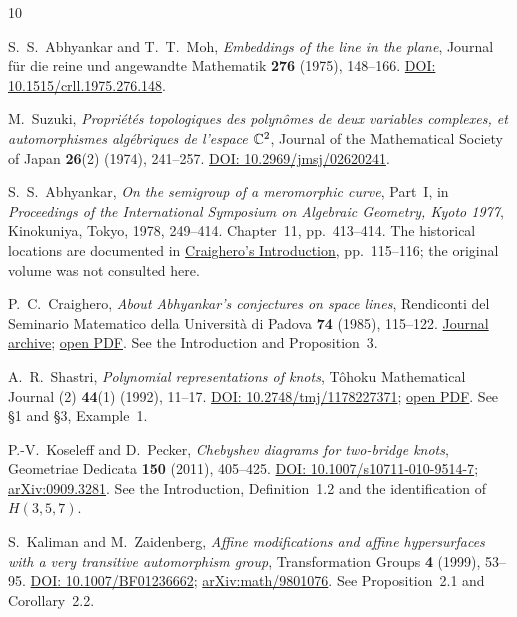 \begin{thebibliography}{10}
\small
\setlength{\itemsep}{7pt}

S.~S.~Abhyankar and T.~T.~Moh,
\emph{Embeddings of the line in the plane},
Journal f\"ur die reine und angewandte Mathematik \textbf{276}
(1975), 148--166.
\href{https://doi.org/10.1515/crll.1975.276.148}{DOI: 10.1515/crll.1975.276.148}.

M.~Suzuki,
\emph{Propri\'et\'es topologiques des polyn\^omes de deux variables
complexes, et automorphismes alg\'ebriques de l'espace $\mathbb C^2$},
Journal of the Mathematical Society of Japan \textbf{26}(2)
(1974), 241--257.
\href{https://doi.org/10.2969/jmsj/02620241}{DOI: 10.2969/jmsj/02620241}.

S.~S.~Abhyankar,
\emph{On the semigroup of a meromorphic curve}, Part~I,
in \emph{Proceedings of the International Symposium on Algebraic
Geometry, Kyoto 1977}, Kinokuniya, Tokyo, 1978, 249--414.
Chapter~11, pp.~413--414.
The historical locations are documented in
\href{https://www.numdam.org/item/RSMUP_1985__74__115_0.pdf}{Craighero's
Introduction}, pp.~115--116; the original volume was not consulted here.

P.~C.~Craighero,
\emph{About Abhyankar's conjectures on space lines},
Rendiconti del Seminario Matematico della Universit\`a di Padova
\textbf{74} (1985), 115--122.
\href{https://www.numdam.org/item/RSMUP_1985__74__115_0/}{Journal archive};
\href{https://www.numdam.org/item/RSMUP_1985__74__115_0.pdf}{open PDF}.
See the Introduction and Proposition~3.

A.~R.~Shastri,
\emph{Polynomial representations of knots},
T\^ohoku Mathematical Journal (2) \textbf{44}(1) (1992), 11--17.
\href{https://doi.org/10.2748/tmj/1178227371}{DOI: 10.2748/tmj/1178227371};
\href{https://www.jstage.jst.go.jp/article/tmj1949/44/1/44_1_11/_pdf}{open PDF}.
See \S1 and \S3, Example~1.

P.-V.~Koseleff and D.~Pecker,
\emph{Chebyshev diagrams for two-bridge knots},
Geometriae Dedicata \textbf{150} (2011), 405--425.
\href{https://doi.org/10.1007/s10711-010-9514-7}{DOI: 10.1007/s10711-010-9514-7};
\href{https://arxiv.org/abs/0909.3281}{arXiv:0909.3281}.
See the Introduction, Definition~1.2 and the identification of $H(3,5,7)$.

S.~Kaliman and M.~Zaidenberg,
\emph{Affine modifications and affine hypersurfaces with a very
transitive automorphism group},
Transformation Groups \textbf{4} (1999), 53--95.
\href{https://doi.org/10.1007/BF01236662}{DOI: 10.1007/BF01236662};
\href{https://arxiv.org/abs/math/9801076}{arXiv:math/9801076}.
See Proposition~2.1 and Corollary~2.2.


\end{thebibliography}
